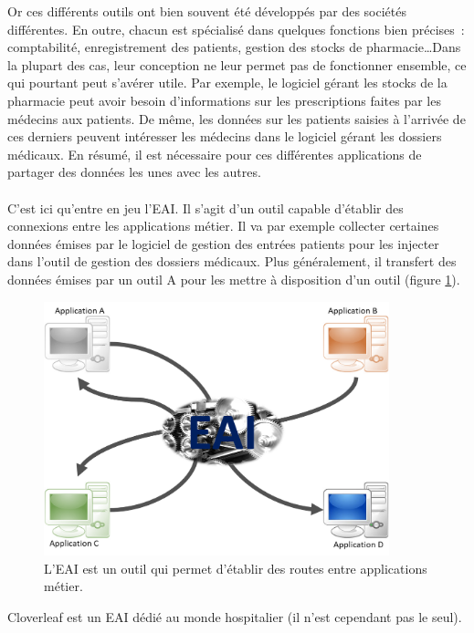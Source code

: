 			Or ces différents outils ont bien souvent été développés par des sociétés
			différentes. En outre, chacun est spécialisé dans quelques fonctions
			bien précises~: comptabilité, enregistrement des patients, gestion des
			stocks de pharmacie\ldots Dans la plupart des cas, leur conception ne leur
			permet pas de fonctionner ensemble, ce qui pourtant peut s'avérer utile. Par
			exemple, le logiciel gérant les stocks de la pharmacie peut avoir besoin
			d'informations sur les prescriptions faites par les médecins aux patients. De
			même, les données sur les patients saisies à l'arrivée de ces derniers
			peuvent intéresser les médecins dans le logiciel gérant les dossiers
			médicaux. En résumé, il est nécessaire pour ces différentes applications de
			partager des données les unes avec les autres.
			
			\paragraph{}%
			C'est ici qu'entre en jeu l'EAI. Il s'agit d'un outil capable d'établir des
			connexions entre les applications métier. Il va par exemple collecter
			certaines données émises par le logiciel de gestion des entrées patients
			pour les injecter dans l'outil de gestion des dossiers médicaux. Plus
			généralement, il transfert des données émises par un outil A pour les
			mettre à disposition d'un outil (figure \ref{intro_interop}).
			\begin{figure}[H]
				\centering
				\includegraphics[width=10cm]{../img/eai_1.png}
				\caption{\label{intro_interop} L'EAI est un outil qui permet
				d'établir des routes entre applications métier.}
			\end{figure}
			Cloverleaf est un EAI dédié au monde hospitalier (il n'est cependant pas le
			seul).
			
